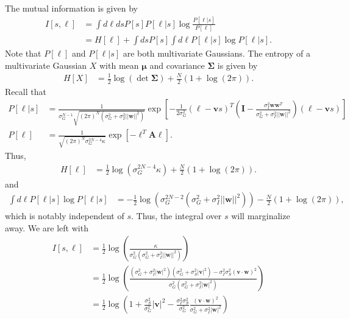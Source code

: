 \documentclass[11pt]{article}
\begin{document}
	The mutual information is given by 
	\begin{align}
		I[s, \boldsymbol{\ell}] &= \int d\boldsymbol{\ell} ds  P[s] P[\boldsymbol{\ell}|s]\log \frac{P[\boldsymbol{\ell}|s]}{P[\boldsymbol{\ell}]} \\
		&= H[\boldsymbol{\ell}] + \int ds P[s] \int d\boldsymbol{\ell} P[\boldsymbol{\ell}|s] \log P[\boldsymbol{\ell}|s].
	\end{align}
	Note that $P[\boldsymbol{\ell}]$ and $P[\boldsymbol{\ell}|s]$ are both multivariate Gaussians. The entropy of a multivariate Gaussian $X$ with mean $\boldsymbol{\mu}$ and covariance $\boldsymbol{\Sigma}$ is given by 
	\begin{align}
		H[X] &= \frac{1}{2} \log \left(\det\boldsymbol{\Sigma}\right) + \frac{N}{2} (1 + \log(2\pi)).
	\end{align}
	Recall that 
	\begin{align}
		P[\boldsymbol{\ell}|s] &= \frac{1}{\sigma_G^{N-1} \sqrt{(2\pi)^N(\sigma_G^2 + \sigma_I^2 ||\mathbf{w}||^2)}} \exp\left[-\frac{1}{2\sigma_G^2} (\boldsymbol{\ell} - \mathbf{v}s)^T\left(\mathbf{I} - \frac{\sigma_I^2 \mathbf{ww}^T}{\sigma_G^2 + \sigma_I^2 ||\mathbf{w}||^2}\right) (\boldsymbol{\ell} - \mathbf{v}s) \right] \\
		P[\boldsymbol{\ell}] &= \frac{1}{ \sqrt{(2\pi)^N \sigma_G^{2N-4}\kappa}} \exp\left[-\boldsymbol{\ell}^T \mathbf{A} \boldsymbol{\ell}\right].
	\end{align}
	Thus,
	\begin{align}
		H[\boldsymbol{\ell}] &= \frac{1}{2}\log( \sigma_G^{2N-4} \kappa) + \frac{N}{2}(1 + \log(2\pi)).
	\end{align}
	and 
	\begin{align}
		\int d\boldsymbol{\ell} P[\boldsymbol{\ell}|s] \log P[\boldsymbol{\ell}|s] &= -\frac{1}{2}\log(\sigma_G^{2N-2} (\sigma_G^2 +\sigma_I^2 ||\mathbf{w}||^2)) - \frac{N}{2} (1+\log(2\pi)),
	\end{align}
	which is notably independent of $s$. Thus, the integral over $s$ will marginalize away. We are left with
	\begin{align}
		I[s,\boldsymbol{\ell}] &= \frac{1}{2}\log\left(\frac{\kappa}{\sigma_G^2 (\sigma_G^2 + \sigma_I^2 ||\mathbf{w}||^2)}\right) \\
		&= \frac{1}{2} \log \left(\frac{ (\sigma_G^2 + \sigma_I^2 |\mathbf{w}|^2)(\sigma_G^2 + \sigma_S^2 |\mathbf{v}|^2) - \sigma_I^2 \sigma_S^2 (\mathbf{v}\cdot\mathbf{w})^2}{\sigma_G^2 (\sigma_G^2 + \sigma_I^2 |\mathbf{w}|^2)}\right) \\
		&= \frac{1}{2} \log \left(1 + \frac{\sigma_S^2}{\sigma_G^2} |\mathbf{v}|^2 - \frac{\sigma_I^2 \sigma_S^2}{\sigma_G^2} \frac{(\mathbf{v}\cdot\mathbf{w})^2}{\sigma_G^2 + \sigma_I^2 |\mathbf{w}|^2}\right)
	\end{align}
\end{document}
